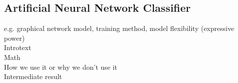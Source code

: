\subsection{Artificial Neural Network Classifier}

e.g. graphical network model, training method, model flexibility (expressive power)\\

Introtext\\

Math\\

How we use it or why we don't use it\\

Intermediate result\\

